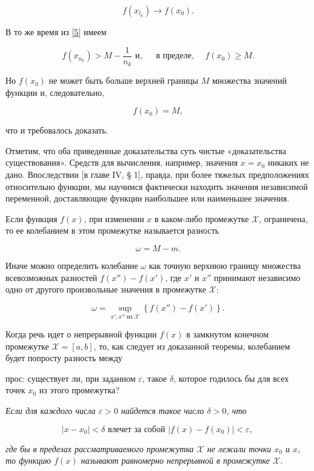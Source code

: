 \documentclass[10pt, twoside]{article}
\newcounter{subtopic}
\begin{document}
$$
  f\left(x_{l_{k}}\right) \to f\left(x_{0}\right) .
$$

В то же время из \eqref{5} имеем

$$
  f\left(x_{n_{k}}\right)>M-\frac{1}{n_{k}} \text { и, } \quad \text { в пределе, } \quad f\left(x_{0}\right) \geqslant  M .
$$

Но $f\left(x_{0}\right)$ не может быть больше верхней границы $M$ множества значений функции и, следовательно,

$$
  f\left(x_{0}\right)=M,
$$

что и требовалось доказать.

Отметим, что оба приведенные доказательства суть чистые «доказательства существования». Средств для вычисления, например, значения $x=x_{0}$ никаких не дано. Впоследствии [в главе IV, § 1], правда, при более тяжелых предположениях относительно функции, мы научимся фактически находить значения независимой переменной, доставляющие функции наибольшее или наименьшее значения.

Если функция $f(x)$, при изменении $x$ в каком-либо промежутке $\mathcal{X}$, ограничена, то ее колебанием в этом промежутке называется разность

$$
  \omega=M-m .
$$

Иначе можно определить колебание $\omega$ как точную верхнюю границу множества всевозможных разностей $f\left(x''\right)-f\left(x'\right)$, где $x'$ и $x''$ принимают независимо одно от другого произвольные значения в промежутке $\mathscr{X}$:

$$
  \omega=\sup _{x', x'' \text { из } \mathscr{X}} \left\{f\left(x''\right)-f\left(x'\right)\right\} .
$$

Когда речь идет о непрерывной функции $f(x)$ в замкнутом конечном промежутке $\mathscr{X}=[a, b]$, то, как следует из доказанной теоремы, колебанием будет попросту разность между

\newpage
\setcounter{page}{179}
\setcounter{subtopic}{86}

прос: существует ли, при заданном $\varepsilon$, такое $\delta$, которое годилось бы для всех точек $x_{0}$ из этого промежутка?

\textit{Если для каждого числа $\varepsilon>0$ найдется такое число $\delta>0$, что}

$$
  \left|x-x_{0}\right|<\delta \text { влечет за собой }\left|f(x)-f\left(x_{0}\right)\right|<\varepsilon \text {, }
$$

\textit{где бы в пределах рассматриваемого промежутка $\mathscr{X}$ не лежали точки $x_{0}$ и $x$, то функцию $f(x)$ называют равномерно непрерывной в промежутке $\mathscr{X}$.}
\end{document}
